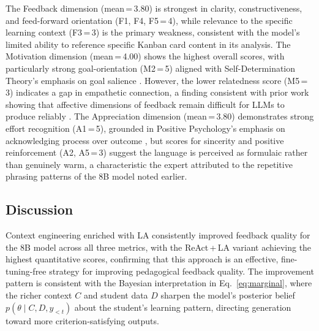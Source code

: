 \documentclass[conference,a4paper]{IEEEtran}
\begin{document}
The Feedback dimension (mean\,=\,3.80) is 
strongest in clarity, constructiveness, and 
feed-forward orientation (F1, F4, F5\,=\,4), 
while relevance to the specific learning context 
(F3\,=\,3) is the primary weakness, consistent 
with the model's limited ability to reference 
specific Kanban card content in its analysis. 
The Motivation dimension (mean\,=\,4.00) shows 
the highest overall scores, with particularly 
strong goal-orientation (M2\,=\,5) aligned with 
Self-Determination Theory's emphasis on goal 
salience \cite{DeciRyan1985IntrinsicMotivation}. 
However, the lower relatedness score (M5\,=\,3) 
indicates a gap in empathetic connection, a 
finding consistent with prior work showing 
that affective dimensions of feedback remain 
difficult for LLMs to produce reliably 
\cite{jacobsen2025promises}. The Appreciation 
dimension (mean\,=\,3.80) demonstrates strong 
effort recognition (A1\,=\,5), grounded in 
Positive Psychology's emphasis on acknowledging 
process over outcome 
\cite{Fredrickson2001BroadenBuild}, but scores 
for sincerity and positive reinforcement (A2, 
A5\,=\,3) suggest the language is perceived as 
formulaic rather than genuinely warm, a
characteristic the expert attributed to the 
repetitive phrasing patterns of the 8B model 
noted earlier.

\subsection{Discussion}

Context engineering enriched with LA
consistently improved feedback quality for the
8B model across all three metrics, with the
ReAct\,+\,LA variant achieving the highest
quantitative scores, confirming that this
approach is an effective, fine-tuning-free
strategy for improving pedagogical feedback quality. The improvement 
pattern is consistent with the Bayesian 
interpretation in Eq.~\eqref{eq:marginal}, where the 
richer context $C$ and student data $D$ sharpen 
the model's posterior belief $p(\theta \mid C, 
D, y_{<t})$ about the student's learning 
pattern, directing generation toward more 
criterion-satisfying outputs.
\end{document}
